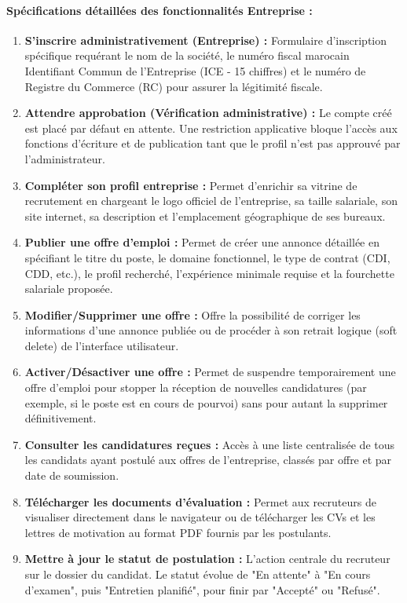 \paragraph{Spécifications détaillées des fonctionnalités Entreprise :}
\begin{enumerate}
    \item \textbf{S'inscrire administrativement (Entreprise) :} Formulaire d'inscription spécifique requérant le nom de la société, le numéro fiscal marocain Identifiant Commun de l'Entreprise (ICE - 15 chiffres) et le numéro de Registre du Commerce (RC) pour assurer la légitimité fiscale.
    \item \textbf{Attendre approbation (Vérification administrative) :} Le compte créé est placé par défaut en attente. Une restriction applicative bloque l'accès aux fonctions d'écriture et de publication tant que le profil n'est pas approuvé par l'administrateur.
    \item \textbf{Compléter son profil entreprise :} Permet d'enrichir sa vitrine de recrutement en chargeant le logo officiel de l'entreprise, sa taille salariale, son site internet, sa description et l'emplacement géographique de ses bureaux.
    \item \textbf{Publier une offre d'emploi :} Permet de créer une annonce détaillée en spécifiant le titre du poste, le domaine fonctionnel, le type de contrat (CDI, CDD, etc.), le profil recherché, l'expérience minimale requise et la fourchette salariale proposée.
    \item \textbf{Modifier/Supprimer une offre :} Offre la possibilité de corriger les informations d'une annonce publiée ou de procéder à son retrait logique (soft delete) de l'interface utilisateur.
    \item \textbf{Activer/Désactiver une offre :} Permet de suspendre temporairement une offre d'emploi pour stopper la réception de nouvelles candidatures (par exemple, si le poste est en cours de pourvoi) sans pour autant la supprimer définitivement.
    \item \textbf{Consulter les candidatures reçues :} Accès à une liste centralisée de tous les candidats ayant postulé aux offres de l'entreprise, classés par offre et par date de soumission.
    \item \textbf{Télécharger les documents d'évaluation :} Permet aux recruteurs de visualiser directement dans le navigateur ou de télécharger les CVs et les lettres de motivation au format PDF fournis par les postulants.
    \item \textbf{Mettre à jour le statut de postulation :} L'action centrale du recruteur sur le dossier du candidat. Le statut évolue de "En attente" à "En cours d'examen", puis "Entretien planifié", pour finir par "Accepté" ou "Refusé".

\end{enumerate}
